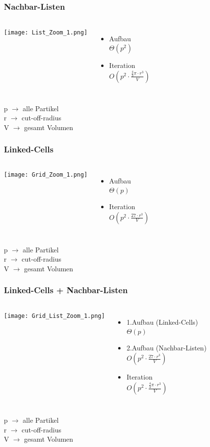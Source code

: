 \documentclass[compress]{beamer}
\begin{document}
\subsection{}
\begin{frame}
	\frametitle{Nachbar-Listen}
	\begin{columns}
		\centering
			\texttt{[image: List\_Zoom\_1.png]}
		\begin{itemize}
			\item Aufbau\\ $\Theta\left(p^2\right)$
			\item Iteration \\$O\left(p^2\cdot \frac{\frac{4}{3}\pi\cdot r^3}{V}\right)$
		\end{itemize}
	\end{columns} 
p $\rightarrow$ alle Partikel\\
r $\rightarrow$ cut-off-radius \\
V $\rightarrow$ gesamt Volumen
\end{frame}
\begin{frame}
	\frametitle{Linked-Cells}
	\begin{columns}
		\column{0.6\linewidth}
		\centering
		\texttt{[image: Grid\_Zoom\_1.png]}
		\column{0.4\linewidth}
		\begin{itemize}
			\item Aufbau\\ $\Theta\left(p\right)$
			\item Iteration \\$O\left(p^2\cdot \frac{27 \cdot r^3}{V}\right)$
		\end{itemize}
	\end{columns} 
p $\rightarrow$ alle Partikel\\
r $\rightarrow$ cut-off-radius \\
V $\rightarrow$ gesamt Volumen
\end{frame}
\begin{frame}
	\frametitle{Linked-Cells + Nachbar-Listen}
	\begin{columns}
		\centering
		\texttt{[image: Grid\_List\_Zoom\_1.png]}
		\begin{itemize}
			\item 1.Aufbau (Linked-Cells) \\ $\Theta\left(p\right)$
			\item 2.Aufbau (Nachbar-Listen) \\$O\left(p^2\cdot \frac{27 \cdot r^3}{V}\right)$
			\item Iteration \\$O\left(p^2\cdot \frac{\frac{4}{3}\pi\cdot r^3}{V}\right)$
		\end{itemize}
	\end{columns} 
p $\rightarrow$ alle Partikel\\
r $\rightarrow$ cut-off-radius \\
V $\rightarrow$ gesamt Volumen
\end{frame}
\end{document}
